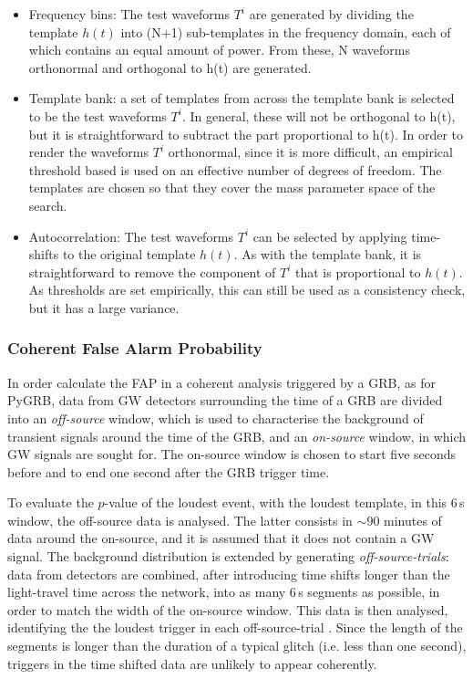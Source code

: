 \documentclass[binding=0.6cm, LaM]{sapthesis}
\begin{document}
        \begin{itemize}
        \item Frequency bins: The test waveforms $T^i$ are generated by dividing the template $h(t)$ into (N+1) 
          sub-templates in the frequency domain, each of which contains an equal amount of power. 
          From these, N waveforms orthonormal and orthogonal to h(t) are generated. 
        \item Template bank: a set of templates from across the template bank is selected to be the test waveforms $T^i$.
          In general, these will not be orthogonal to h(t), but it is straightforward to subtract the part proportional to h(t). 	
          In order to render the waveforms $T^i$ orthonormal, since it is more difficult, 
          an empirical threshold based is used on an effective number of degrees of freedom. 
          The templates are chosen so that they cover the mass parameter space of the search. 
        \item Autocorrelation: The test waveforms $T^i$ can be selected by applying time-shifts to the original template $h(t)$. 
          As with the template bank, it is straightforward to remove the component of $T^i$ that is proportional to $h(t)$. 
          As thresholds are set empirically, this can still be used as a consistency check, but it has a large variance. 
        \end{itemize}

\subsubsection{Coherent False Alarm Probability}

	In order calculate the FAP in a coherent analysis triggered by a GRB,
	as for {\ttfamily PyGRB}, data from GW detectors surrounding the time of a GRB 
	are divided into an \textit{off-source} window, which is used to characterise the background 
	of transient signals around the time of the GRB, and an \textit{on-source} window, in
	which GW signals are sought for. 
 	The on-source window is chosen to start five seconds before and to end one second after the GRB trigger time.
	
	To evaluate the $p$-value of the loudest event, with the loudest template,
	in this 6\,s window, the off-source data is analysed.
	The latter consists in $\sim 90$ minutes of data around the on-source, 
	and it is assumed that it does not contain a GW signal.
	The background distribution is extended by generating \textit{off-source-trials}:
	data from detectors are combined, after introducing time shifts longer than the light-travel time across the network,
	into as many 6\,s segments as possible, in order to match the width of the on-source window.
	This data is then analysed, identifying the the loudest trigger in each off-source-trial \cite{46}.
	Since the length of the segments is longer than the duration of a typical glitch (i.e. less than one second),
	triggers in the time shifted data are unlikely to appear coherently. 
\end{document}
